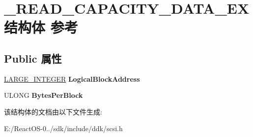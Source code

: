 \hypertarget{struct___r_e_a_d___c_a_p_a_c_i_t_y___d_a_t_a___e_x}{}\section{\+\_\+\+R\+E\+A\+D\+\_\+\+C\+A\+P\+A\+C\+I\+T\+Y\+\_\+\+D\+A\+T\+A\+\_\+\+E\+X结构体 参考}
\label{struct___r_e_a_d___c_a_p_a_c_i_t_y___d_a_t_a___e_x}
\subsection*{Public 属性}
\begin{DoxyCompactItemize}
\item 
\mbox{\label{struct___r_e_a_d___c_a_p_a_c_i_t_y___d_a_t_a___e_x_a95890a3a500a1fb8d7c68f6a44e34c33}} 
\hyperlink{union___l_a_r_g_e___i_n_t_e_g_e_r}{L\+A\+R\+G\+E\+\_\+\+I\+N\+T\+E\+G\+ER} {\bfseries Logical\+Block\+Address}
\item 
\mbox{\label{struct___r_e_a_d___c_a_p_a_c_i_t_y___d_a_t_a___e_x_af5ba8312b275e2fa3de060b9e17ff611}} 
U\+L\+O\+NG {\bfseries Bytes\+Per\+Block}
\end{DoxyCompactItemize}


该结构体的文档由以下文件生成\+:\begin{DoxyCompactItemize}
\item 
E\+:/\+React\+O\+S-\/0../sdk/include/ddk/scsi.\+h\end{DoxyCompactItemize}
